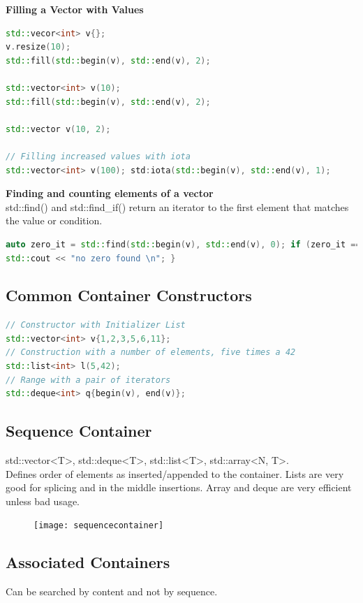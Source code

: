 \textbf{Filling a Vector with Values}
\begin{lstlisting}[language=C++]
std::vecor<int> v{};
v.resize(10);
std::fill(std::begin(v), std::end(v), 2);

std::vector<int> v(10); 
std::fill(std::begin(v), std::end(v), 2);

std::vector v(10, 2);

// Filling increased values with iota
std::vector<int> v(100); std:iota(std::begin(v), std::end(v), 1);
\end{lstlisting}

\textbf{Finding and counting elements of a vector} \\
 std::find() and std::find\_if() return an iterator to the first element that matches the value or condition.
\begin{lstlisting}[language=C++]
auto zero_it = std::find(std::begin(v), std::end(v), 0); if (zero_it == std::end(v)) {
std::cout << "no zero found \n"; }
\end{lstlisting}

\subsection{Common Container Constructors}

\begin{lstlisting}[language=C++]
// Constructor with Initializer List
std::vector<int> v{1,2,3,5,6,11};
// Construction with a number of elements, five times a 42
std::list<int> l(5,42);
// Range with a pair of iterators
std::deque<int> q{begin(v), end(v)};
\end{lstlisting}

\subsection{Sequence Container}
std::vector<T>, std::deque<T>, std::list<T>, std::array<N, T>.\\
Defines order of elements as inserted/appended to the container. Lists are very good for splicing and in the middle insertions. Array and deque are very efficient unless bad usage.

\begin{figure}[h!]
 	\centering
 	\texttt{[image: sequencecontainer]}
  \caption{}
\end{figure}


\subsection{Associated Containers}
Can be searched by content and not by sequence. 

